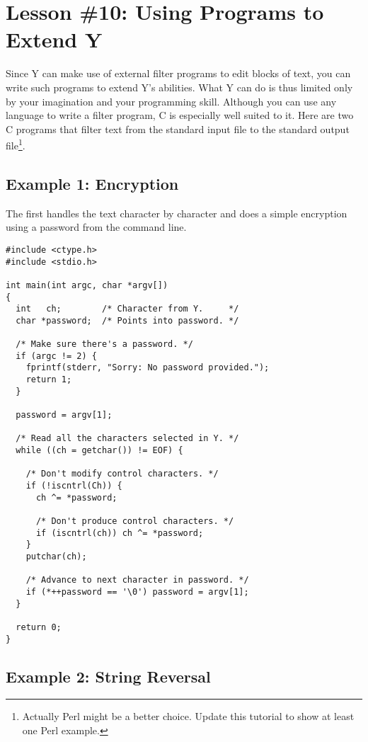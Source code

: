 \section{Lesson \#10: Using Programs to Extend Y}

Since Y can make use of external filter programs to edit blocks of text, you can write such
programs to extend Y's abilities. What Y can do is thus limited only by your imagination and
your programming skill. Although you can use any language to write a filter program, C is
especially well suited to it. Here are two C programs that filter text from the standard input
file to the standard output file\footnote{Actually Perl might be a better choice. Update this
  tutorial to show at least one Perl example.}.

\subsection{Example 1: Encryption}

The first handles the text character by character and does a simple encryption using a password
from the command line.

\begin{verbatim}
#include <ctype.h>
#include <stdio.h>

int main(int argc, char *argv[])
{
  int   ch;        /* Character from Y.     */
  char *password;  /* Points into password. */

  /* Make sure there's a password. */
  if (argc != 2) {
    fprintf(stderr, "Sorry: No password provided.");
    return 1;
  }
    
  password = argv[1];

  /* Read all the characters selected in Y. */
  while ((ch = getchar()) != EOF) {

    /* Don't modify control characters. */
    if (!iscntrl(Ch)) {
      ch ^= *password;

      /* Don't produce control characters. */
      if (iscntrl(ch)) ch ^= *password;
    }
    putchar(ch);

    /* Advance to next character in password. */
    if (*++password == '\0') password = argv[1];
  }

  return 0;
}
\end{verbatim}

\subsection{Example 2: String Reversal}

